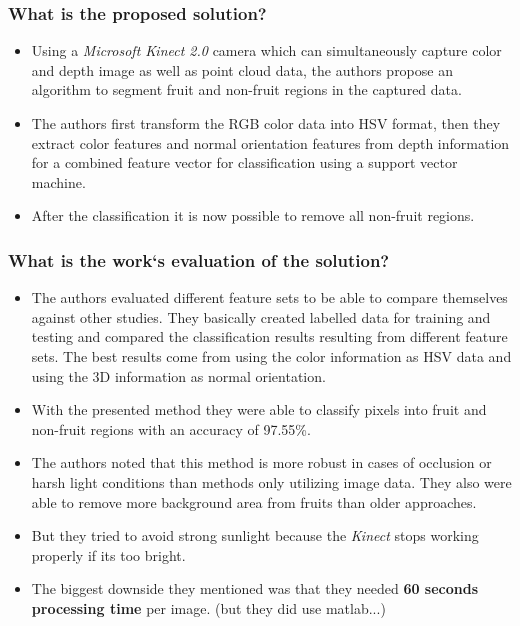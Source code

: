     \subsubsection*{What is the proposed solution?}
    \begin{itemize}
        \item Using a \emph{Microsoft Kinect 2.0} camera which can simultaneously capture color and depth image as well as point cloud data, the authors propose an algorithm to segment fruit and non-fruit regions in the captured data.
        \item The authors first transform the RGB color data into HSV format, then they extract color features and normal orientation features from depth information for a combined feature vector for classification using a support vector machine.
        \item After the classification it is now possible to remove all non-fruit regions.
    \end{itemize}
    \subsubsection*{What is the work`s evaluation of the solution?}
    \begin{itemize}
        \item The authors evaluated different feature sets to be able to compare themselves against other studies. They basically created labelled data for training and testing and compared the classification results resulting from different feature sets. The best results come from using the color information as HSV data and using the 3D information as normal orientation. 
        \item With the presented method they were able to classify pixels into fruit and non-fruit regions with an accuracy of 97.55\%. 
        \item The authors noted that this method is more robust in cases of occlusion or harsh light conditions than methods only utilizing image data. They also were able to remove more background area from fruits than older approaches.
        \item But they tried to avoid strong sunlight because the \emph{Kinect} stops working properly if its too bright.
        \item The biggest downside they mentioned was that they needed \textbf{60 seconds processing time} per image. (but they did use matlab...)
    \end{itemize}

